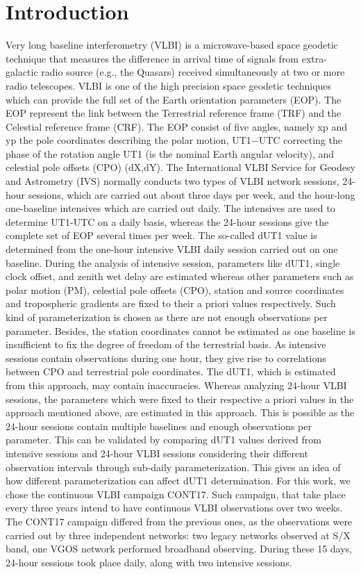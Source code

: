 \documentclass[smallextended]{svjour3}       %
\begin{document}
\section{Introduction}
\label{intro}
Very long baseline interferometry (VLBI) is a microwave-based space geodetic technique that measures the difference in arrival time of signals from extra-galactic radio source (e.g., the Quasars) received simultaneously at two or more radio telescopes. VLBI is one of the high precision space geodetic techniques which can provide the full set of the Earth orientation parameters (EOP). The EOP represent the link between the Terrestrial reference frame (TRF) and the Celestial reference frame (CRF). The EOP consist of five angles, namely xp and yp the pole coordinates describing the polar motion, UT1−UTC correcting the phase of the rotation angle UT1 (is the nominal
Earth angular velocity), and celestial pole offsets (CPO) (dX,dY).
The International VLBI Service for Geodesy and Astrometry (IVS) normally conducts two types of
VLBI network sessions, 24-hour sessions, which are carried out about three days per week, and the
hour-long one-baseline intensives which are carried out daily. The intensives are used to determine
UT1-UTC on a daily basis, whereas the 24-hour sessions give the complete set of EOP several
times per week. The so-called dUT1 value is determined from the one-hour intensive VLBI daily
session carried out on one baseline. During the analysis of intensive session, parameters like dUT1,
single clock offset, and zenith wet delay are estimated whereas other parameters such as polar motion
(PM), celestial pole offsets (CPO), station and source coordinates and tropospheric gradients
are fixed to their a priori values respectively. Such kind of parameterization is chosen as there are not enough observations per parameter. Besides, the station coordinates cannot be estimated as
one baseline is insufficient to fix the degree of freedom of the terrestrial basis. As intensive sessions
contain observations during one hour, they give rise to correlations between CPO and terrestrial
pole coordinates. The dUT1, which is estimated from this approach, may contain inaccuracies.
Whereas analyzing 24-hour VLBI sessions, the parameters which were fixed to their respective a
priori values in the approach mentioned above, are estimated in this approach. This is possible as
the 24-hour sessions contain multiple baselines and enough observations per parameter.
This can be validated by comparing dUT1 values derived from intensive sessions and 24-hour VLBI
sessions considering their different observation intervals through sub-daily parameterization. This
gives an idea of how different parameterization can affect dUT1 determination. For this work, we
chose the continuous VLBI campaign CONT17. Such campaign, that take place every three years
intend to have continuous VLBI observations over two weeks. The CONT17 campaign differed from
the previous ones, as the observations were carried out by three independent networks: two legacy
networks observed at S/X band, one VGOS network performed broadband observing. During these
15 days, 24-hour sessions took place daily, along with two intensive sessions.
\end{document}
